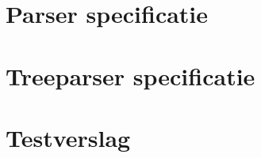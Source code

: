 \clearpage

\section{Parser specificatie} %
\label{sec:parser_specificatie}


\section{Treeparser specificatie} %
\label{sec:treeparser_specificatie}


\section{Testverslag} %
\label{sec:testverslag}


\clearpage